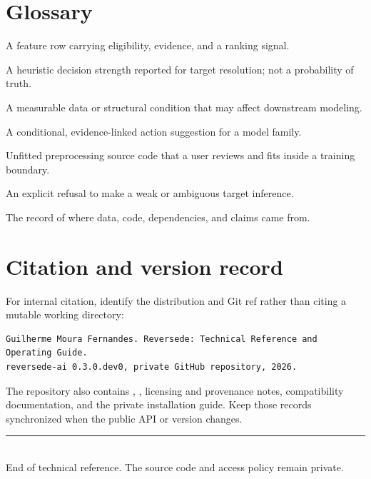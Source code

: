 \documentclass[10pt,a4paper,oneside]{article}
\newcommand{\code}[1]{\texttt{\small\detokenize{#1}}}
\begin{document}
\section{Glossary}
\begin{description}[style=nextline,leftmargin=3.2cm]
  \item[Candidate] A feature row carrying eligibility, evidence, and a ranking signal.
  \item[Confidence] A heuristic decision strength reported for target resolution; not a probability of truth.
  \item[Stress] A measurable data or structural condition that may affect downstream modeling.
  \item[Prescription] A conditional, evidence-linked action suggestion for a model family.
  \item[Blueprint] Unfitted preprocessing source code that a user reviews and fits inside a training boundary.
  \item[Abstention] An explicit refusal to make a weak or ambiguous target inference.
  \item[Provenance] The record of where data, code, dependencies, and claims came from.
\end{description}

\section{Citation and version record}

For internal citation, identify the distribution and Git ref rather than citing a mutable working
directory:

\begin{lstlisting}
Guilherme Moura Fernandes. Reversede: Technical Reference and Operating Guide.
reversede-ai 0.3.0.dev0, private GitHub repository, 2026.
\end{lstlisting}

The repository also contains \code{CITATION.cff}, \code{AUTHORS.md}, licensing and provenance notes,
compatibility documentation, and the private installation guide. Keep those records synchronized when
the public API or version changes.

\vfill
\begin{center}
\color{navy}\rule{0.72\textwidth}{0.7pt}\\[0.3cm]
\small\textcolor{muted}{End of technical reference. The source code and access policy remain private.}
\end{center}
\end{document}
